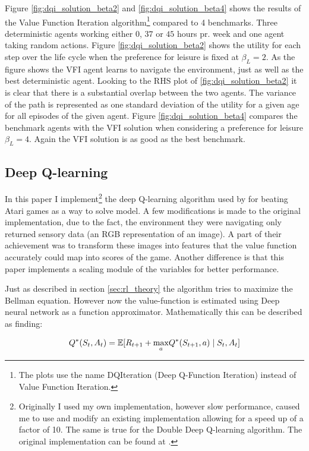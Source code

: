 Figure \ref{fig:dqi_solution_beta2} and \ref{fig:dqi_solution_beta4} shows the results of the Value Function Iteration algorithm\footnote{The plots use the name DQIteration (Deep Q-Function Iteration) instead of Value Function Iteration.} compared to 4 benchmarks. Three deterministic agents working either $0$, $37$ or $45$ hours pr. week and one agent taking random actions. Figure \ref{fig:dqi_solution_beta2} shows the utility for each step over the life cycle when the preference for leisure is fixed at $\beta_L = 2$. As the figure shows the VFI agent learns to navigate the environment, just as well as the best deterministic agent. Looking to the RHS plot of \ref{fig:dqi_solution_beta2} it is clear that there is a substantial overlap between the two agents. The variance of the path is represented as one standard deviation of the utility for a given age for all episodes of the given agent. Figure \ref{fig:dqi_solution_beta4} compares the benchmark agents with the VFI solution when considering a preference for leisure $\beta_L = 4$. Again the VFI solution is as good as the best benchmark.

\subsection{Deep Q-learning}

In this paper I implement\footnote{Originally I used my own implementation, however slow performance, caused me to use and modify an existing implementation allowing for a speed up of a factor of 10. The same is true for the Double Deep Q-learning algorithm. The original implementation can be found at \textcite{tabor_deep_2020}.} the deep Q-learning algorithm used by \textcite{mnih_playing_2013} for beating Atari games as a way to solve model. A few modifications is made to the original implementation, due to the fact, the environment they were navigating only returned sensory data (an RGB representation of an image).  A part of their achievement was to transform these images into features that the value function accurately could map into scores of the game. Another difference is that this paper implements a scaling module of the variables for better performance.

Just as described in section \ref{sec:rl_theory} the algorithm tries to maximize the Bellman equation. However now the value-function is estimated using Deep neural network as a function approximator. Mathematically this can be described as finding:

\begin{equation}
    Q^*(S_t,A_t) = \mathbb{E} [R_{t+1} + \underset{a}{\max}  Q^*(S_{t+1}, a) \mid S_t, A_t]
\end{equation}

